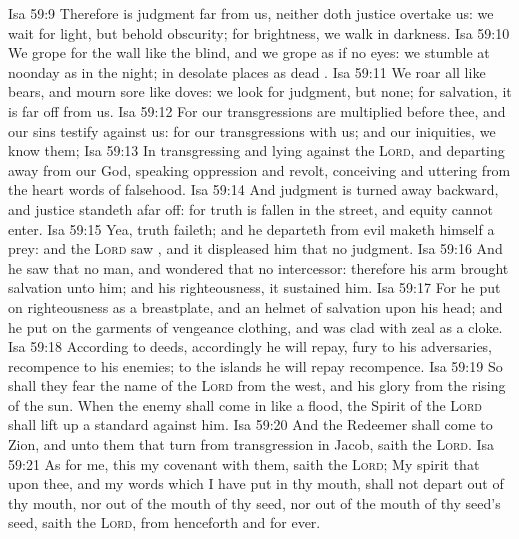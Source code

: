 \vs Isa 59:9 Therefore is judgment far from us, neither doth justice overtake us: we wait for light, but behold obscurity; for brightness,  we walk in darkness.
\vs Isa 59:10 We grope for the wall like the blind, and we grope as if  no eyes: we stumble at noonday as in the night;  in desolate places as dead .
\vs Isa 59:11 We roar all like bears, and mourn sore like doves: we look for judgment, but  none; for salvation,  it is far off from us.
\vs Isa 59:12 For our transgressions are multiplied before thee, and our sins testify against us: for our transgressions  with us; and  our iniquities, we know them;
\vs Isa 59:13 In transgressing and lying against the \textsc{Lord}, and departing away from our God, speaking oppression and revolt, conceiving and uttering from the heart words of falsehood.
\vs Isa 59:14 And judgment is turned away backward, and justice standeth afar off: for truth is fallen in the street, and equity cannot enter.
\vs Isa 59:15 Yea, truth faileth; and he  departeth from evil maketh himself a prey: and the \textsc{Lord} saw , and it displeased him that  no judgment.
\vs Isa 59:16 And he saw that  no man, and wondered that  no intercessor: therefore his arm brought salvation unto him; and his righteousness, it sustained him.
\vs Isa 59:17 For he put on righteousness as a breastplate, and an helmet of salvation upon his head; and he put on the garments of vengeance  clothing, and was clad with zeal as a cloke.
\vs Isa 59:18 According to  deeds, accordingly he will repay, fury to his adversaries, recompence to his enemies; to the islands he will repay recompence.
\vs Isa 59:19 So shall they fear the name of the \textsc{Lord} from the west, and his glory from the rising of the sun. When the enemy shall come in like a flood, the Spirit of the \textsc{Lord} shall lift up a standard against him.
\vs Isa 59:20 And the Redeemer shall come to Zion, and unto them that turn from transgression in Jacob, saith the \textsc{Lord}.
\vs Isa 59:21 As for me, this  my covenant with them, saith the \textsc{Lord}; My spirit that  upon thee, and my words which I have put in thy mouth, shall not depart out of thy mouth, nor out of the mouth of thy seed, nor out of the mouth of thy seed's seed, saith the \textsc{Lord}, from henceforth and for ever.
